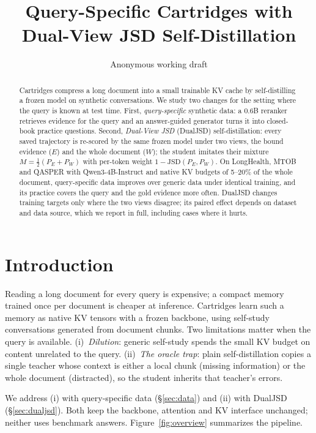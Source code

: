 \documentclass[11pt]{article}
\title{Query-Specific Cartridges with Dual-View JSD Self-Distillation}
\author{Anonymous working draft}
\begin{document}
\maketitle
\begin{abstract}
Cartridges compress a long document into a small trainable KV cache by self-distilling a frozen model on synthetic conversations. We study two changes for the setting where the query is known at test time. First, \emph{query-specific} synthetic data: a 0.6B reranker retrieves evidence for the query and an answer-guided generator turns it into closed-book practice questions. Second, \emph{Dual-View JSD} (DualJSD) self-distillation: every saved trajectory is re-scored by the same frozen model under two views, the bound evidence ($E$) and the whole document ($W$); the student imitates their mixture $M=\tfrac12(P_E+P_W)$ with per-token weight $1-\mathrm{JSD}(P_E,P_W)$. On LongHealth, MTOB and QASPER with Qwen3-4B-Instruct and native KV budgets of 5--20\% of the whole document, query-specific data improves over generic data under identical training, and its practice covers the query and the gold evidence more often. DualJSD changes training targets only where the two views disagree; its paired effect depends on dataset and data source, which we report in full, including cases where it hurts.
\end{abstract}

\section{Introduction}
Reading a long document for every query is expensive; a compact memory trained once per document is cheaper at inference. Cartridges \citep{eyuboglu2025cartridges} learn such a memory as native KV tensors with a frozen backbone, using self-study conversations generated from document chunks. Two limitations matter when the query is available. (i)~\emph{Dilution}: generic self-study spends the small KV budget on content unrelated to the query. (ii)~\emph{The oracle trap}: plain self-distillation copies a single teacher whose context is either a local chunk (missing information) or the whole document (distracted), so the student inherits that teacher's errors.

We address (i) with query-specific data (\S\ref{sec:data}) and (ii) with DualJSD (\S\ref{sec:dualjsd}). Both keep the backbone, attention and KV interface unchanged; neither uses benchmark answers. Figure~\ref{fig:overview} summarizes the pipeline.
\end{document}
